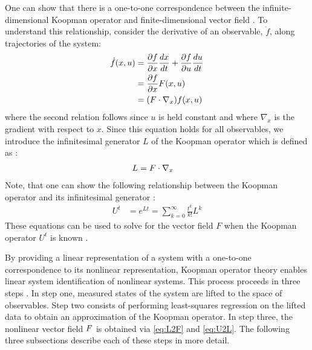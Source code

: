 One can show that there is a one-to-one correspondence between the infinite-dimensional Koopman operator and finite-dimensional vector field .
To understand this relationship, consider the derivative of an observable, $\dot{f}$, along trajectories of the system:
\begin{align}
\dot{f}(x,u) &= \frac{\partial f}{\partial x} \frac{dx}{dt} + \frac{\partial f}{\partial u}\frac{du}{dt} \\
           &= \frac{\partial f}{\partial x} F(x,u) \\
           &= ( F \cdot \nabla_{x} ) f(x,u)
\end{align}
where the second relation follows since $u$ is held constant and where $\nabla_x$ is the gradient with respect to $x$.
Since this equation holds for all observables, we introduce the infinitesimal generator $L$   of the Koopman operator  \cite[Section 7.6]{lasota2013chaos} which is defined as :
\begin{align}
    L &= F \cdot \nabla_{x}
    \label{eq:L2F}
\end{align}
Note, that one can show the following relationship between the Koopman operator and its infinitesimal generator \cite{}:
\begin{align}
    U^t &= e^{L t} = \sum_{k=0}^\infty \frac{t^k}{k!} L^k
    \label{eq:U2L}
\end{align}
These equations can be used to solve for the vector field $F$ when the Koopman operator $U^t$ is known .

By providing a linear representation of a system with a one-to-one correspondence to its nonlinear representation, Koopman operator theory enables linear system identification of nonlinear systems. 
This process proceeds in three steps  .
In step one, measured states of the system are lifted to the space of observables.
Step two consists of performing least-squares regression on the lifted data to obtain an approximation of the Koopman operator.
In step three, the nonlinear vector field $F$ is obtained via \eqref{eq:L2F} and \eqref{eq:U2L}.
The following three subsections describe each of these steps in more detail.

